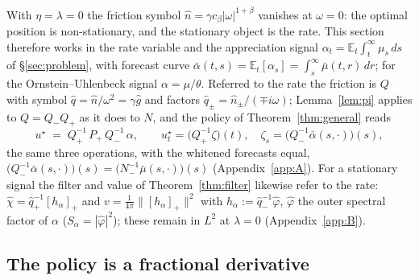 \documentclass[11pt]{article}
\newcommand{\E}{\mathbb{E}}
\newcommand{\pluspart}[1]{\left[#1\right]_+}
\theoremstyle{plain}
\theoremstyle{definition}
\theoremstyle{remark}
\begin{document}
With $\eta=\lambda=0$ the friction symbol $\hat n=\gamma c_\beta|\omega|^{1+\beta}$ vanishes at $\omega=0$: the optimal position is non-stationary, and the stationary object is the rate. This section therefore works in the rate variable and the appreciation signal $\alpha_t=\E_t\int_t^\infty\mu_s\,ds$ of \S\ref{sec:problem}, with forecast curve $\bar\alpha(t,s)=\E_t[\alpha_s]=\int_s^\infty\bar\mu(t,r)\,dr$; for the Ornstein--Uhlenbeck signal $\alpha=\mu/\theta$. Referred to the rate the friction is $Q$ with symbol $\hat q=\hat n/\omega^2=\gamma\hat g$ and factors $\hat q_\pm=\hat n_\pm/(\mp i\omega)$; Lemma~\ref{lem:pi} applies to $Q=Q_-Q_+$ as it does to $N$, and the policy of Theorem~\ref{thm:general} reads
\begin{equation}\label{eq:rate-policy}
u^\star \;=\; Q_+^{-1}\,P_+\,Q_-^{-1}\,\alpha,
\qquad
u^\star_t=\bigl(Q_+^{-1}\zeta\bigr)(t),\quad \zeta_s=\bigl(Q_-^{-1}\bar\alpha(s,\cdot)\bigr)(s),
\end{equation}
the same three operations, with the whitened forecasts equal, $\bigl(Q_-^{-1}\bar\alpha(s,\cdot)\bigr)(s)=\bigl(N_-^{-1}\bar\mu(s,\cdot)\bigr)(s)$ (Appendix~\ref{app:A}). For a stationary signal the filter and value of Theorem~\ref{thm:filter} likewise refer to the rate: $\hat\chi=\hat q_+^{-1}\pluspart{h_\alpha}$ and $v=\frac{1}{4\pi}\|\pluspart{h_\alpha}\|^2$ with $h_\alpha:=\hat q_-^{-1}\hat\varphi$, $\hat\varphi$ the outer spectral factor of $\alpha$ ($S_\alpha=|\hat\varphi|^2$); these remain in $L^2$ at $\lambda=0$ (Appendix~\ref{app:B}).

\subsection{The policy is a fractional derivative}\label{sec:fracpolicy}
\end{document}

